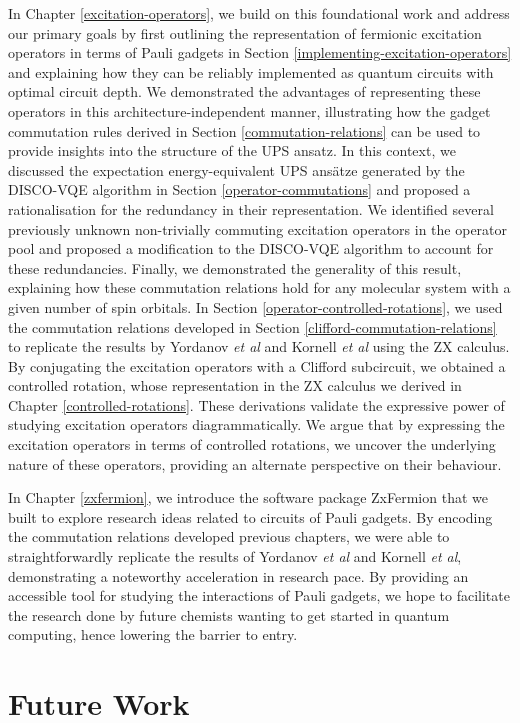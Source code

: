 In Chapter \ref{excitation-operators}, we build on this foundational work and address our primary goals by first outlining the representation of fermionic excitation operators in terms of Pauli gadgets in Section \ref{implementing-excitation-operators} and explaining how they can be reliably implemented as quantum circuits with optimal circuit depth. We demonstrated the advantages of representing these operators in this architecture-independent manner, illustrating how the gadget commutation rules derived in Section \ref{commutation-relations} can be used to provide insights into the structure of the UPS ansatz. In this context, we discussed the expectation energy-equivalent UPS ansätze generated by the DISCO-VQE algorithm in Section \ref{operator-commutations} and proposed a rationalisation for the redundancy in their representation. We identified several previously unknown non-trivially commuting excitation operators in the operator pool and proposed a modification to the DISCO-VQE algorithm to account for these redundancies. Finally, we demonstrated the generality of this result, explaining how these commutation relations hold for any molecular system with a given number of spin orbitals. In Section \ref{operator-controlled-rotations}, we used the commutation relations developed in Section \ref{clifford-commutation-relations} to replicate the results by Yordanov \textit{et al} and Kornell \textit{et al} using the ZX calculus. By conjugating the excitation operators with a Clifford subcircuit, we obtained a controlled rotation, whose representation in the ZX calculus we derived in Chapter \ref{controlled-rotations}. These derivations validate the expressive power of studying excitation operators diagrammatically. We argue that by expressing the excitation operators in terms of controlled rotations, we uncover the underlying nature of these operators, providing an alternate perspective on their behaviour.

In Chapter \ref{zxfermion}, we introduce the software package ZxFermion that we built to explore research ideas related to circuits of Pauli gadgets. By encoding the commutation relations developed previous chapters, we were able to straightforwardly replicate the results of Yordanov \textit{et al} and Kornell \textit{et al}, demonstrating a noteworthy acceleration in research pace. By providing an accessible tool for studying the interactions of Pauli gadgets, we hope to facilitate the research done by future chemists wanting to get started in quantum computing, hence lowering the barrier to entry.

\section{Future Work}

